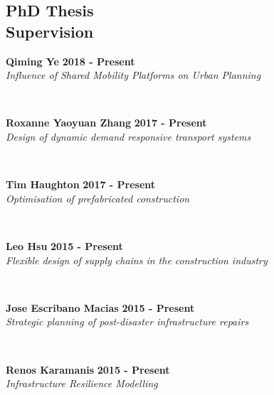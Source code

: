\documentclass[margin]{res}
\newcommand\tab[1][1cm]{\hspace*{#1}}
\begin{document}
\begin{resume}
\section{\sc PhD Thesis\\ Supervision}
	\vspace{0.03in}
	\begin{minipage}{\textwidth}
	{\bf Qiming Ye} \hfill {\bf 2018 - Present} \\
	\tab[0.2in] \textit{Influence of Shared Mobility Platforms on Urban Planning}
	\end{minipage}
	\\
	\vspace{0.03in}
	\begin{minipage}{\textwidth}
	{\bf Roxanne Yaoyuan Zhang} \hfill {\bf 2017 - Present} \\
	\tab[0.2in] \textit{Design of dynamic demand responsive transport systems}
	\end{minipage}
	\\
	\vspace{0.03in}
	\begin{minipage}{\textwidth}
	{\bf Tim Haughton} \hfill {\bf 2017 - Present} \\
	\tab[0.2in] \textit{Optimisation of prefabricated construction}
	\end{minipage}
	\\
	\vspace{0.03in}
	\begin{minipage}{\textwidth}
	{\bf Leo Hsu} \hfill {\bf 2015 - Present} \\
	\tab[0.2in] \textit{Flexible design of supply chains in the construction industry}
	\end{minipage}
	\\
	\vspace{0.03in}
	\begin{minipage}{\textwidth}
	{\bf Jose Escribano Macias} \hfill {\bf 2015 - Present} \\
	\tab[0.2in] \textit{Strategic planning of post-disaster infrastructure repairs}
	\end{minipage}
	\\
	\vspace{0.03in}
	\begin{minipage}{\textwidth}
	{\bf Renos Karamanis} \hfill {\bf 2015 - Present} \\
	\tab[0.2in] \textit{Infrastructure Resilience Modelling}
	\end{minipage}
	\\

\end{resume}
\end{document}
